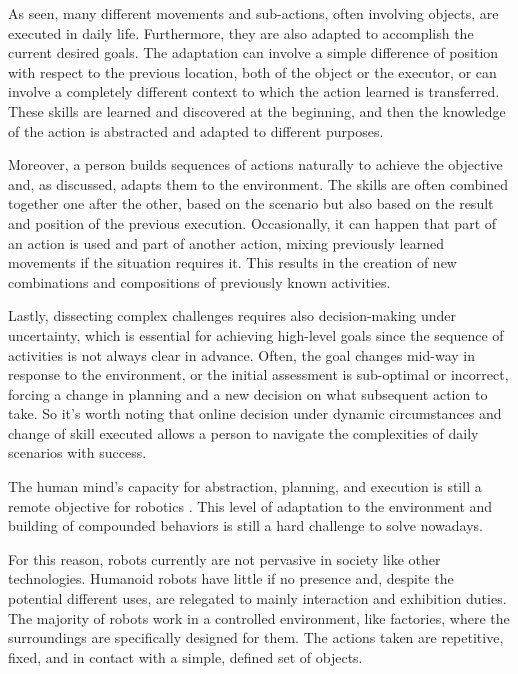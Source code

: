 As seen, many different movements and sub-actions, often involving objects, are executed in daily life. Furthermore, they are also adapted to accomplish the current desired goals. The adaptation can involve a simple difference of position with respect to the previous location, both of the object or the executor, or can involve a completely different context to which the action learned is transferred. These skills are learned and discovered at the beginning, and then the knowledge of the action is abstracted and adapted to different purposes.  

Moreover, a person builds sequences of actions naturally to achieve the objective and, as discussed, adapts them to the environment. The skills are often combined together one after the other, based on the scenario but also based on the result and position of the previous execution.  Occasionally, it can happen that part of an action is used and part of another action, mixing previously learned movements if the situation requires it. This results in the creation of new combinations and compositions of previously known activities.    

Lastly, dissecting complex challenges requires also decision-making under uncertainty, which is essential for achieving high-level goals since the sequence of activities is not always clear in advance. Often, the goal changes mid-way in response to the environment, or the initial assessment is sub-optimal or incorrect, forcing a change in planning and a new decision on what subsequent action to take. So it's worth noting that online decision under dynamic circumstances and change of skill executed allows a person to navigate the complexities of daily scenarios with success.

The human mind's capacity for abstraction, planning, and execution is still a remote objective for robotics \cite{konidaris2019necessity}. 
This level of adaptation to the environment and building of compounded behaviors is still a hard challenge to solve nowadays.

For this reason, robots currently are not pervasive in society like other technologies. Humanoid robots have little if no presence and, despite the potential different uses, are relegated to mainly interaction and exhibition duties. The majority of robots work in a controlled environment, like factories, where the surroundings are specifically designed for them. The actions taken are repetitive, fixed, and in contact with a simple, defined set of objects.

